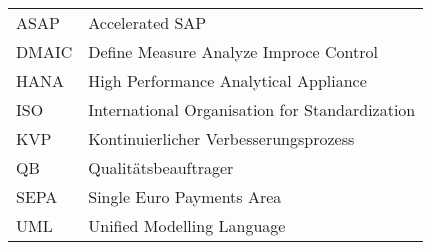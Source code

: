 \begin{tabular}{p{3cm} l}
    ASAP & Accelerated SAP \\
    DMAIC & Define Measure Analyze Improce Control \\
    HANA & High Performance Analytical Appliance \\
    ISO & International Organisation for Standardization \\
    KVP & Kontinuierlicher Verbesserungsprozess \\
    QB & Qualitätsbeauftrager \\
    SEPA & Single Euro Payments Area \\
    UML & Unified Modelling Language \\
\end{tabular} 